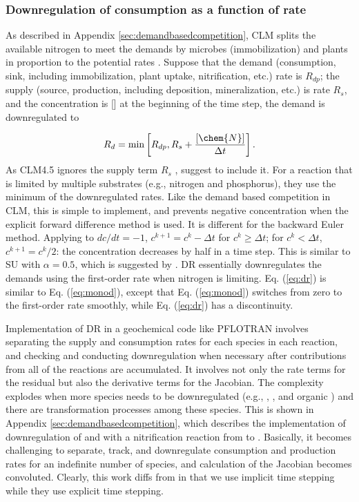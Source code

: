 \documentclass[gmd, manuscript]{copernicus}
\begin{document}
\subsubsection{Downregulation of consumption as a function of rate}
As described in Appendix \ref{sec:demandbasedcompetition}, CLM splits the
available nitrogen to meet the demands by microbes (immobilization) and plants in
proportion to the potential rates \citep{Thornton2005}. Suppose that the
demand (consumption, sink, including immobilization, plant uptake,
nitrification, etc.) rate is $R_{dp}$; the supply (source, production,
including deposition, mineralization, etc.) is rate $R_s$, and the
concentration is [] at the beginning of the time step, the demand is
downregulated to

\begin{equation}
R_d=\text{min}\left[R_{dp}, R_s + \frac{[\chem{N}]}{\Delta t}\right].	
\label{eq:dr}
\end{equation}
As CLM4.5 ignores the supply term $R_s$ \citep{Oleson2013}, \citet{Tang2015}
suggest to include it. For a reaction that is limited by multiple substrates
(e.g., nitrogen and phosphorus), they use the minimum of the downregulated
rates. Like the demand based competition in CLM, this is simple to implement,
and prevents negative concentration when the explicit forward difference method
is used.  
It is different for the backward Euler method. 
Applying to $dc/dt=-1$, $c^{k+1}=c^k-\Delta t$ for $c^k \geq \Delta t$; for
$c^k < \Delta t$, $c^{k+1} = c^k/2$: the concentration decreases by half in a
time step. This is similar to SU with $\alpha=0.5$, which is suggested by
\citet{Bethke2007}. DR essentially downregulates the demands using the
first-order rate when nitrogen is limiting. Eq. (\ref{eq:dr}) is similar
to Eq. (\ref{eq:monod}), except that Eq. (\ref{eq:monod}) switches from zero to
the first-order rate smoothly, while Eq. (\ref{eq:dr}) has a discontinuity. 

Implementation of DR in a geochemical code like PFLOTRAN involves separating
the supply and consumption rates for each species in each reaction, and
checking and conducting downregulation when necessary after contributions from
all of the reactions are accumulated. It involves not only the rate terms for
the residual but also the derivative terms for the Jacobian. The complexity
explodes when more species needs to be downregulated (e.g., ,
, and organic ) and there are transformation processes
among these species. This is shown in Appendix \ref{sec:demandbasedcompetition}, which describes the
implementation of downregulation of  and  with a
nitrification reaction from  to . Basically, it
becomes challenging to separate, track, and downregulate consumption and
production rates for an indefinite number of species, and calculation of the
Jacobian becomes convoluted. Clearly, this work diffs from \citet{Tang2015} in
that we use implicit time stepping while they use explicit
time stepping.
\end{document}
